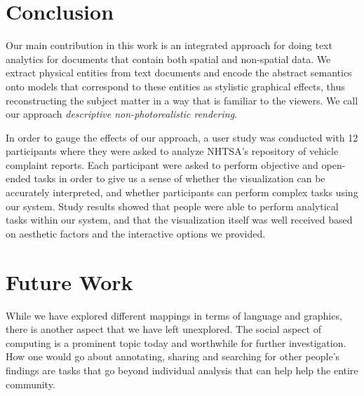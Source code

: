 \section{Conclusion}
Our main contribution in this work is an integrated approach for doing text
analytics for documents that contain both spatial and non-spatial data. We extract
physical entities from text documents and encode the abstract semantics onto 
\threed models that correspond to these entities as stylistic graphical effects, thus 
reconstructing the subject matter in a way that is familiar to the viewers. We call
our approach \emph{descriptive non-photorealistic rendering}.

In order to gauge the effects of our approach, a user study was conducted with
12 participants where they were asked to analyze NHTSA's repository of vehicle
complaint reports. Each participant were asked to perform objective and
open-ended tasks in order to give us a sense of whether the visualization can be
accurately interpreted, and whether participants can perform complex tasks using our system.
Study results showed that people were able to perform analytical tasks
within our system, and that the visualization itself was well received based on
aesthetic factors and the interactive options we provided. 




 

\section{Future Work}
While we have explored different mappings in terms of language and graphics,
there is another aspect that we have left unexplored. The social aspect of
computing is a prominent topic today and worthwhile for further investigation.
How one would go about annotating, sharing and searching for other people's
findings are tasks that go beyond individual analysis that can help help the
entire community.

